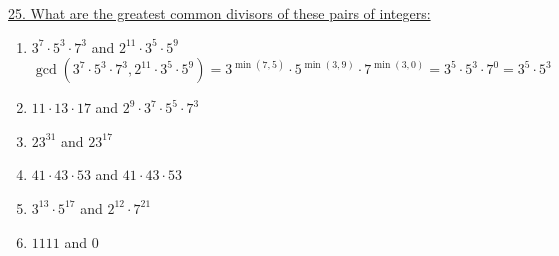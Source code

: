 \documentclass[12pt]{article}
\begin{document}
\vspace{5mm}
\noindent\underline{25. What are the greatest common divisors of these pairs of integers:}
\begin{enumerate}[label=(\alph*)]
    \item $3^7 \cdot 5^3 \cdot 7^3$ and $2^{11} \cdot 3^5 \cdot 5^9$
\[
\gcd(3^7 \cdot 5^3 \cdot 7^3, 2^{11} \cdot 3^5 \cdot 5^9) = 3^{\min(7,5)} \cdot 5^{\min(3,9)} \cdot 7^{\min(3,0)} = 3^5 \cdot 5^3 \cdot 7^0 = 3^5 \cdot 5^3
\]
    \item $11 \cdot 13 \cdot 17$ and $2^9 \cdot 3^7 \cdot 5^5 \cdot 7^3$
    \item $23^{31}$ and $23^{17}$
    \item $41 \cdot 43 \cdot 53$ and $41 \cdot 43 \cdot 53$
    \item $3^{13} \cdot 5^{17}$ and $2^{12} \cdot 7^{21}$
    \item $1111$ and $0$

    
\end{enumerate}
\end{document}
